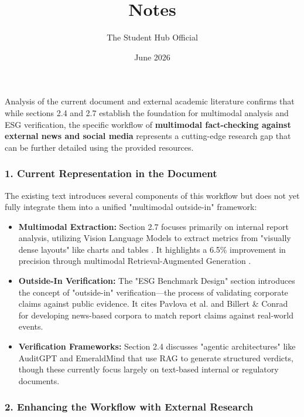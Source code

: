 \documentclass{article}
\title{Notes}
\author{The Student Hub Official}
\date{June 2026}
\begin{document}
\maketitle

Analysis of the current document and external academic literature confirms that while sections 2.4 and 2.7 establish the foundation for multimodal analysis and ESG verification, the specific workflow of \textbf{multimodal fact-checking against external news and social media} represents a cutting-edge research gap that can be further detailed using the provided resources.
\subsubsection{1. Current Representation in the Document}

The existing text introduces several components of this workflow but does not yet fully integrate them into a unified "multimodal outside-in" framework:
\begin{itemize}
\item 

\textbf{Multimodal Extraction:} Section 2.7 focuses primarily on internal report analysis, utilizing Vision Language Models to extract metrics from "visually dense layouts" like charts and tables  \parencite[]{tanay_gupta_aafe0c6a, lars_wilhelmi_8d7e860b}. It highlights a 6.5\% improvement in precision through multimodal Retrieval-Augmented Generation  \parencite{g_saipooja_m_n_488bfdd6}.\item 

\textbf{Outside-In Verification:} The "ESG Benchmark Design" section introduces the concept of "outside-in" verification—the process of validating corporate claims against public evidence. It cites Pavlova et al.  \parencite{mariya_pavlova_259be499} and Billert \& Conrad  \parencite{fabian_billert_a5fbb687} for developing news-based corpora to match report claims against real-world events.\item 

\textbf{Verification Frameworks:} Section 2.4 discusses "agentic architectures" like AuditGPT  \parencite{abhijeet_b__moghe_963e6c96} and EmeraldMind  \parencite{kaoukis__georgios_35bab107} that use RAG to generate structured verdicts, though these currently focus largely on text-based internal or regulatory documents.
\end{itemize}
\subsubsection{2. Enhancing the Workflow with External Research}
\end{document}
